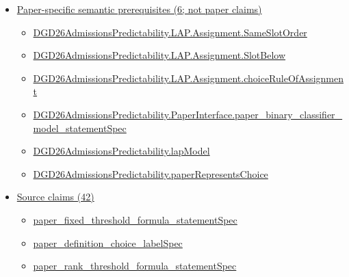 \documentclass[10pt]{article}
\begin{document}
\begin{itemize}[leftmargin=1.2em]
\begin{itemize}[leftmargin=1.2em]
\item \hyperlink{library-prerequisite-12ed6f0751675deb}{Applied\allowbreak{}Modeling\allowbreak{}Lib.\allowbreak{}Finite\allowbreak{}Choice.\allowbreak{}sequential\allowbreak{}Composition}
\end{itemize}
\item \hyperlink{paper-prerequisite-section-5ef5ef0364b6939c}{Paper-specific semantic prerequisites (6; not paper claims)}
\begin{itemize}[leftmargin=1.2em]
\item \hyperlink{paper-prerequisite-153f2d129286958c}{DGD26\allowbreak{}Admissions\allowbreak{}Predictability.\allowbreak{}LAP.\allowbreak{}Assignment.\allowbreak{}Same\allowbreak{}Slot\allowbreak{}Order}
\item \hyperlink{paper-prerequisite-b883b62c7f37ad70}{DGD26\allowbreak{}Admissions\allowbreak{}Predictability.\allowbreak{}LAP.\allowbreak{}Assignment.\allowbreak{}Slot\allowbreak{}Below}
\item \hyperlink{paper-prerequisite-5af4464d786cd8a4}{DGD26\allowbreak{}Admissions\allowbreak{}Predictability.\allowbreak{}LAP.\allowbreak{}Assignment.\allowbreak{}choice\allowbreak{}Rule\allowbreak{}Of\allowbreak{}Assignment}
\item \hyperlink{paper-prerequisite-235ba8d5b2f94673}{DGD26\allowbreak{}Admissions\allowbreak{}Predictability.\allowbreak{}Paper\allowbreak{}Interface.\allowbreak{}paper\_\allowbreak{}binary\_\allowbreak{}classifier\_\allowbreak{}model\_\allowbreak{}statement\allowbreak{}Spec}
\item \hyperlink{paper-prerequisite-1bbfb7435b6ab793}{DGD26\allowbreak{}Admissions\allowbreak{}Predictability.\allowbreak{}lap\allowbreak{}Model}
\item \hyperlink{paper-prerequisite-d5a41afb23078fa5}{DGD26\allowbreak{}Admissions\allowbreak{}Predictability.\allowbreak{}paper\allowbreak{}Represents\allowbreak{}Choice}
\end{itemize}
\item \hyperlink{source-section-f10b5f68e4acf3dc}{Source claims (42)}
\begin{itemize}[leftmargin=1.2em]
\item \hyperlink{source-claim-03de8677e0f95903}{paper\_\allowbreak{}fixed\_\allowbreak{}threshold\_\allowbreak{}formula\_\allowbreak{}statement\allowbreak{}Spec}
\item \hyperlink{source-claim-d396bf72ee1812a2}{paper\_\allowbreak{}definition\_\allowbreak{}choice\_\allowbreak{}label\allowbreak{}Spec}
\item \hyperlink{source-claim-1e70e813c2db1d8e}{paper\_\allowbreak{}rank\_\allowbreak{}threshold\_\allowbreak{}formula\_\allowbreak{}statement\allowbreak{}Spec}

\end{itemize}
\end{itemize}
\end{document}
